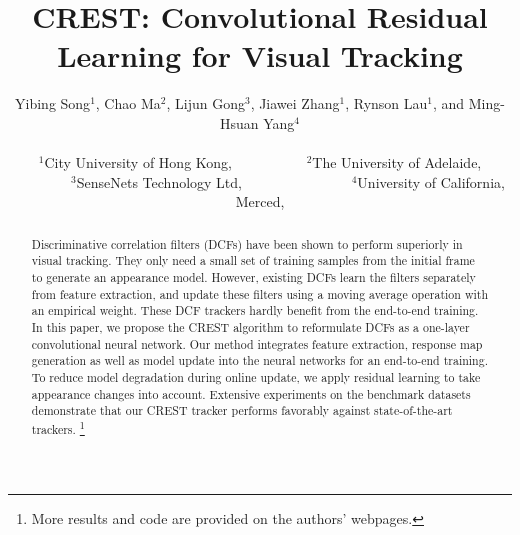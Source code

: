 \documentclass[10pt,twocolumn,letterpaper]{article}
\newcommand{\ryn}[1]{{\color{black}{#1}}}
\begin{document}
\title{CREST: Convolutional Residual Learning for Visual Tracking}

\author{Yibing Song$^1$, Chao Ma$^2$, Lijun Gong$^3$, Jiawei Zhang$^1$, Rynson \ryn{W.H.} Lau$^1$, and Ming-Hsuan Yang$^4$\\\\
$^1$City University of Hong Kong, \ryn{Hong Kong}~~~~~~~~~~$^2$The University of Adelaide, \ryn{Australia}\\
~~~~~~~~$^3$SenseNets Technology Ltd, \ryn{China}~~~~~~~~~~~~~~~$^4$University of California, Merced, \ryn{U.S.A.}\\
}

\maketitle


\begin{abstract}
Discriminative correlation filters (DCFs) have been shown to perform superiorly in visual tracking. They only need a small set of training samples from the initial frame to generate an appearance model. However, existing DCFs learn the filters separately from feature extraction, and update these filters using a moving average operation with an empirical weight. These DCF trackers hardly benefit from the end-to-end training. In this paper, we propose the CREST algorithm to reformulate DCFs as a one-layer convolutional neural network. Our method integrates feature extraction, response map generation as well as model update into the neural networks for an end-to-end training. To reduce model degradation during online update, we apply residual learning to take appearance changes into account. Extensive experiments on the benchmark datasets demonstrate that our CREST tracker performs favorably against state-of-the-art trackers. \footnote{More results and code are provided on the authors' webpages.}
\end{abstract}
\end{document}
